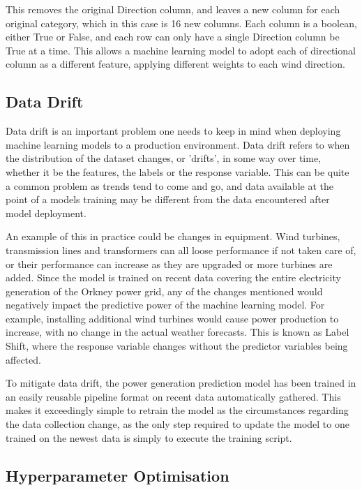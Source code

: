 This removes the original Direction column, and leaves a new column for each original category, which in this case is 16 new columns. Each column is a boolean, either True or False, and each row can only have a single Direction column be True at a time. This allows a machine learning model to adopt each of directional column as a different feature, applying different weights to each wind direction.

\subsection{Data Drift}

Data drift is an important problem one needs to keep in mind when deploying machine learning models to a production environment. Data drift refers to when the distribution of the dataset changes, or 'drifts', in some way over time, whether it be the features, the labels or the response variable. This can be quite a common problem as trends tend to come and go, and data available at the point of a models training may be different from the data encountered after model deployment.

An example of this in practice could be changes in equipment. Wind turbines, transmission lines and transformers can all loose performance if not taken care of, or their performance can increase as they are upgraded or more turbines are added. Since the model is trained on recent data covering the entire electricity generation of the Orkney power grid, any of the changes mentioned would negatively impact the predictive power of the machine learning model. For example, installing additional wind turbines would cause power production to increase, with no change in the actual weather forecasts. This is known as Label Shift, where the response variable changes without the predictor variables being affected.

To mitigate data drift, the power generation prediction model has been trained in an easily reusable pipeline format on recent data automatically gathered. This makes it exceedingly simple to retrain the model as the circumstances regarding the data collection change, as the only step required to update the model to one trained on the newest data is simply to execute the training script.

\subsection{Hyperparameter Optimisation}

